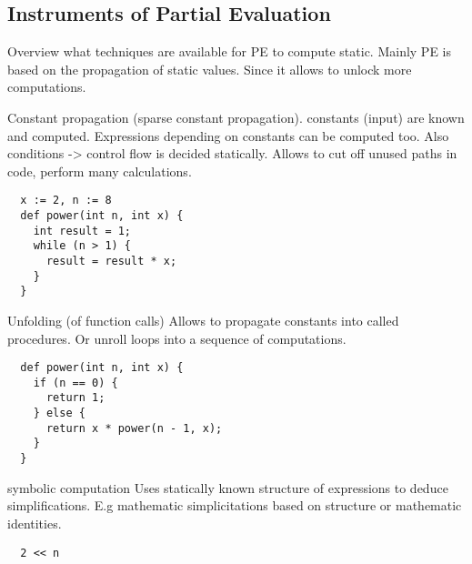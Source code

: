 \subsection{Instruments of Partial Evaluation}\label{sec:pe-instruments}

Overview what techniques are available for PE to compute static.
Mainly PE is based on the propagation of static values.
Since it allows to unlock more computations.

Constant propagation (sparse constant propagation).
constants (input) are known and computed.
Expressions depending on constants can be computed too.
Also conditions -> control flow is decided statically.
Allows to cut off unused paths in code, perform many calculations.

\begin{lstlisting}
  x := 2, n := 8
  def power(int n, int x) {
    int result = 1;
    while (n > 1) {
      result = result * x;
    }
  }
\end{lstlisting}


Unfolding (of function calls)
Allows to propagate constants into called procedures.
Or unroll loops into a sequence of computations.

\begin{lstlisting}
  def power(int n, int x) {
    if (n == 0) {
      return 1;
    } else {
      return x * power(n - 1, x);
    }
  }
\end{lstlisting}


symbolic computation
Uses statically known structure of expressions to deduce simplifications.
E.g mathematic simplicitations based on structure or mathematic identities.

\begin{lstlisting}
  2 << n
\end{lstlisting}



